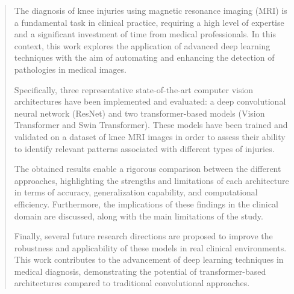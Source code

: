\documentclass[twoside,spanish,a4paper,12pt]{tfg}
\begin{document}
\begin{abstract}
The diagnosis of knee injuries using magnetic resonance imaging (MRI) is a fundamental task in clinical practice, requiring a high level of expertise and a significant investment of time from medical professionals. In this context, this work explores the application of advanced deep learning techniques with the aim of automating and enhancing the detection of pathologies in medical images.

Specifically, three representative state-of-the-art computer vision architectures have been implemented and evaluated: a deep convolutional neural network (ResNet) and two transformer-based models (Vision Transformer and Swin Transformer). These models have been trained and validated on a dataset of knee MRI images in order to assess their ability to identify relevant patterns associated with different types of injuries.

The obtained results enable a rigorous comparison between the different approaches, highlighting the strengths and limitations of each architecture in terms of accuracy, generalization capability, and computational efficiency. Furthermore, the implications of these findings in the clinical domain are discussed, along with the main limitations of the study.

Finally, several future research directions are proposed to improve the robustness and applicability of these models in real clinical environments. This work contributes to the advancement of deep learning techniques in medical diagnosis, demonstrating the potential of transformer-based architectures compared to traditional convolutional approaches.
\end{abstract}
\cleardoublepage
\end{document}
